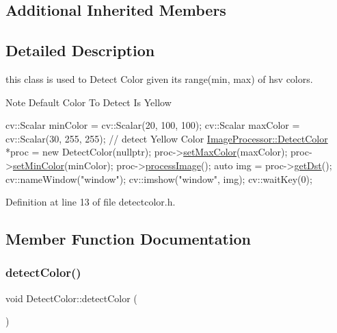 \subsection*{Additional Inherited Members}


\subsection{Detailed Description}
this class is used to Detect Color given it\textquotesingle{}s range(min, max) of hsv colors. 

\begin{DoxyNote}{Note}
Default Color To Detect Is Yellow
\end{DoxyNote}

\begin{DoxyCode}
  cv::Scalar minColor = cv::Scalar(20, 100, 100);
 cv::Scalar  maxColor = cv::Scalar(30, 255, 255); \textcolor{comment}{// detect Yellow Color}
 \hyperlink{class_image_processor_1_1_detect_color}{ImageProcessor::DetectColor} *proc = \textcolor{keyword}{new} DetectColor(\textcolor{keyword}{nullptr});
 proc->\hyperlink{class_image_processor_1_1_detect_color_a71bfe53fe223a7342e17e64adf483b84}{setMaxColor}(maxColor);
proc->\hyperlink{class_image_processor_1_1_detect_color_af9f1efdf1535b8a8516c3feb536fc8b8}{setMinColor}(minColor);
proc->\hyperlink{class_image_processor_1_1_detect_color_afb14622f8e1390f1cf887cc8bf1da568}{processImage}();
\textcolor{keyword}{auto} img = proc->\hyperlink{class_image_processor_1_1_abstract_image_processor_acbf98498ebece7b9f339222097a3429a}{getDst}();
cv::nameWindow(\textcolor{stringliteral}{"window"});
cv::imshow(\textcolor{stringliteral}{"window"}, img);
cv::waitKey(0);
\end{DoxyCode}
 

Definition at line 13 of file detectcolor.\+h.



\subsection{Member Function Documentation}
\mbox{\label{class_image_processor_1_1_detect_color_a2097eb7955a1f87fa5aa21944197fa17}} 
\subsubsection{\texorpdfstring{detect\+Color()}{detectColor()}}
{\footnotesize\ttfamily void Detect\+Color\+::detect\+Color (\begin{DoxyParamCaption}{ }\end{DoxyParamCaption})}



